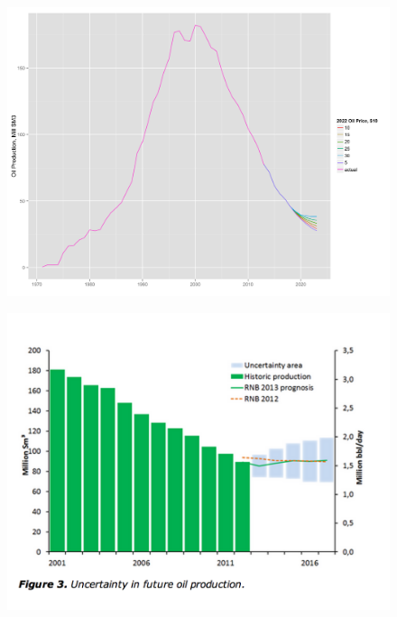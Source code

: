 \documentclass{beamer}
\begin{document}
\begin{frame}[plain]
	\begin{figure}
		\includegraphics[width=.8\textwidth]{figures/tot_forecast.png}
		
		\label{tot_forecast}
	\end{figure}
\end{frame}

\begin{frame}[plain]
\begin{figure}
		\includegraphics[width=.8\textwidth]{figures/NPD_oil_forecast.png}
		
		\label{NPD_oil_forecast}
	\end{figure}
\end{frame}
\end{document}
